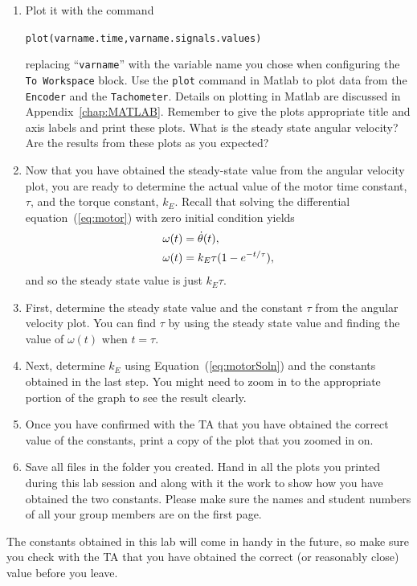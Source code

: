\begin{enumerate}
    \item Plot it with the command
          \begin{center}
              \verb|plot(varname.time,varname.signals.values)|
          \end{center}
          replacing ``\verb|varname|'' with the variable name you chose when
          configuring the \verb|To Workspace| block.  Use the \verb|plot| command in
          \textsf{Matlab} to plot data from the \verb|Encoder| and the
          \verb|Tachometer|.  Details on plotting in \textsf{Matlab} are discussed in
          Appendix~\ref{chap:MATLAB}.  Remember to give the plots appropriate title
          and axis labels and print these plots. What is the steady state angular
          velocity?  Are the results from these plots as you expected?
    \item Now that you have obtained the steady-state value from the angular
          velocity plot, you are ready to determine the actual value of the motor time
          constant, \(\tau \), and the torque constant, \(k_{E}\).  Recall that solving
          the differential equation~(\ref{eq:motor}) with zero initial condition yields
          \begin{align}\notag
              \omega(t)= & \;\dot\theta(t),             \\\label{eq:motorSoln}
              \omega(t)= & \;k_{E}\tau (1-e^{-t/\tau}),
          \end{align}
          and so the steady state value is just \(k_{E}\tau \).
    \item First, determine the steady state value and the constant \(\tau \) from
          the angular velocity plot.  You can find \(\tau \) by using the steady state
          value and finding the value of \(\omega(t)\) when \(t=\tau \).
    \item Next, determine \(k_{E}\) using Equation~(\ref{eq:motorSoln}) and the
          constants obtained in the last step.  You might need to zoom in to the
          appropriate portion of the graph to see the result clearly.
    \item Once you have confirmed with the TA that you have obtained the correct
          value of the constants, print a copy of the plot that you zoomed in on.
    \item Save all files in the folder you created.  Hand in all the plots you
          printed during this lab session and along with it the work to show how you
          have obtained the two constants.  Please make sure the names and student
          numbers of all your group members are on the first page.
\end{enumerate}
The constants obtained in this lab will come in handy in the future, so make
sure you check with the TA that you have obtained the correct (or reasonably
close) value before you leave.

